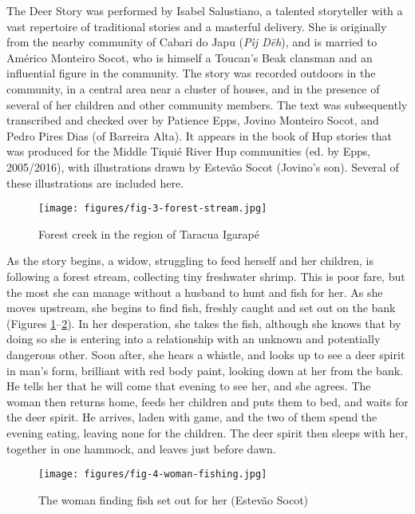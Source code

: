\documentclass[output=paper,
modfonts,nonflat
]{langsci/langscibook}
\begin{document}
    
	The Deer Story was performed by Isabel Salustiano, a talented storyteller with a vast repertoire of traditional stories and a masterful delivery. She is originally from the nearby community of Cabari do Japu (\textit{Pìj Dëh}), and is married to Américo Monteiro Socot, who is himself a Toucan’s Beak clansman and an influential figure in the community. The story was recorded outdoors in the community, in a central area near a cluster of houses, and in the presence of several of her children and other community members. The text was subsequently transcribed and checked over by Patience Epps, Jovino Monteiro Socot, and Pedro Pires Dias (of Barreira Alta). It appears in the book of Hup stories that was produced for the Middle Tiquié River Hup communities (ed. by Epps, 2005/2016), with illustrations drawn by Estevão Socot (Jovino’s son). Several of these illustrations are included here.
 
\begin{figure}[b]
  \texttt{[image: figures/fig-3-forest-stream.jpg]}
  \caption{Forest creek in the region of Taracua Igarapé}
  \label{fig:hup:3}
\end{figure}  
	As the story begins, a widow, struggling to feed herself and her children, is following a forest stream, collecting tiny freshwater shrimp. This is poor fare, but the most she can manage without a husband to hunt and fish for her. As she moves upstream, she begins to find fish, freshly caught and set out on the bank (Figures \ref{fig:hup:3}--\ref{fig:hup:4}). In her desperation, she takes the fish, although she knows that by doing so she is entering into a relationship with an unknown and potentially dangerous other. Soon after, she hears a whistle, and looks up to see a deer spirit in man’s form, brilliant with red body paint, looking down at her from the bank. He tells her that he will come that evening to see her, and she agrees. The woman then returns home, feeds her children and puts them to bed, and waits for the deer spirit. He arrives, laden with game, and the two of them spend the evening eating, leaving none for the children. The deer spirit then sleeps with her, together in one hammock, and leaves just before dawn. 
        
 

\begin{figure}[t]
  \texttt{[image: figures/fig-4-woman-fishing.jpg]}
  \caption{The woman finding fish set out for her (Estevão Socot)}
  \label{fig:hup:4}

\end{figure}
\end{document}
